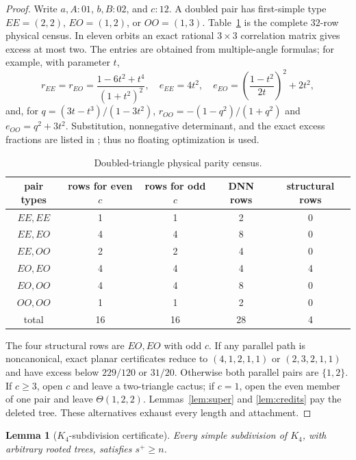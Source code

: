 \documentclass[11pt]{article}
\newtheorem{lemma}[theorem]{Lemma}
\theoremstyle{remark}
\newcommand{\splus}{s^+}
\begin{document}
\begin{proof}
Write $a,A:01$, $b,B:02$, and $c:12$.  A doubled pair has first-simple type
$EE=(2,2)$, $EO=(1,2)$, or $OO=(1,3)$.  Table~\ref{tab:dtri} is the complete
$32$-row physical census.  In eleven orbits an exact rational $3\times3$
correlation matrix gives excess at most two.  The entries are obtained from
multiple-angle formulas; for example, with parameter $t$,
\[
 r_{EE}=r_{EO}=\frac{1-6t^2+t^4}{(1+t^2)^2},\quad
 e_{EE}=4t^2,\quad e_{EO}=\left(\frac{1-t^2}{2t}\right)^2+2t^2,
\]
and, for $q=(3t-t^3)/(1-3t^2)$,
$r_{OO}=-(1-q^2)/(1+q^2)$ and $e_{OO}=q^2+3t^2$.
Substitution, nonnegative determinant, and the exact excess fractions are
listed in \cite{DoubledTriangle}; thus no floating optimization is used.

\begin{table}[ht]
\centering\small
\begin{tabular}{ccccc}
\toprule
pair types&rows for even $c$&rows for odd $c$&DNN rows&structural rows\\
\midrule
$EE,EE$&1&1&2&0\\
$EE,EO$&4&4&8&0\\
$EE,OO$&2&2&4&0\\
$EO,EO$&4&4&4&4\\
$EO,OO$&4&4&8&0\\
$OO,OO$&1&1&2&0\\
\midrule
total&16&16&28&4\\
\bottomrule
\end{tabular}
\caption{Doubled-triangle physical parity census.}\label{tab:dtri}
\end{table}

The four structural rows are $EO,EO$ with odd $c$.  If any parallel path is
noncanonical, exact planar certificates reduce to $(4,1,2,1,1)$ or
$(2,3,2,1,1)$ and have excess below $229/120$ or $31/20$.  Otherwise both
parallel pairs are $\{1,2\}$.  If $c\geq3$, open $c$ and leave a two-triangle
cactus; if $c=1$, open the even member of one pair and leave
$\Theta(1,2,2)$.  Lemmas~\ref{lem:super} and \ref{lem:credits} pay the deleted
tree.  These alternatives exhaust every length and attachment.
\end{proof}

\begin{lemma}[$K_4$-subdivision certificate]\label{lem:k4}
Every simple subdivision of $K_4$, with arbitrary rooted trees, satisfies
$\splus\geq n$.
\end{lemma}
\end{document}
